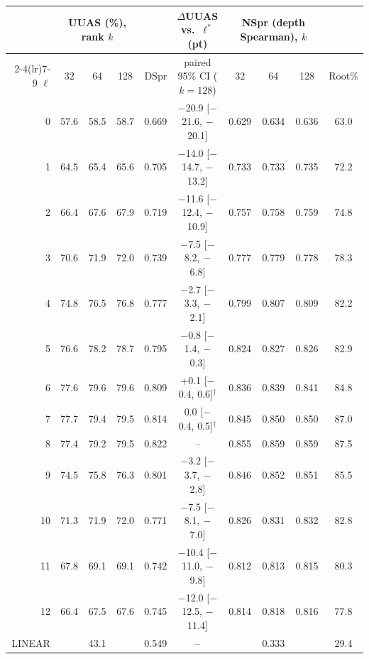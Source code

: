 \begin{tabular}{rccccccccc}
\toprule
 & \multicolumn{3}{c}{UUAS (\%), rank $k$} & & $\Delta$UUAS vs.\ $\ell^*$ (pt) & \multicolumn{3}{c}{NSpr (depth Spearman), $k$} & \\
\cmidrule(lr){2-4}\cmidrule(lr){7-9}
$\ell$ & 32 & 64 & 128 & DSpr & paired 95\% CI ($k{=}128$) & 32 & 64 & 128 & Root\% \\
\midrule
0 & 57.6 & 58.5 & 58.7 & 0.669 & $-$20.9 [$-$21.6, $-$20.1] & 0.629 & 0.634 & 0.636 & 63.0 \\
1 & 64.5 & 65.4 & 65.6 & 0.705 & $-$14.0 [$-$14.7, $-$13.2] & 0.733 & 0.733 & 0.735 & 72.2 \\
2 & 66.4 & 67.6 & 67.9 & 0.719 & $-$11.6 [$-$12.4, $-$10.9] & 0.757 & 0.758 & 0.759 & 74.8 \\
3 & 70.6 & 71.9 & 72.0 & 0.739 & $-$7.5 [$-$8.2, $-$6.8] & 0.777 & 0.779 & 0.778 & 78.3 \\
4 & 74.8 & 76.5 & 76.8 & 0.777 & $-$2.7 [$-$3.3, $-$2.1] & 0.799 & 0.807 & 0.809 & 82.2 \\
5 & 76.6 & 78.2 & 78.7 & 0.795 & $-$0.8 [$-$1.4, $-$0.3] & 0.824 & 0.827 & 0.826 & 82.9 \\
6 & 77.6 & 79.6 & 79.6 & 0.809 & +0.1 [$-$0.4, 0.6]$^\dagger$ & 0.836 & 0.839 & 0.841 & 84.8 \\
7 & 77.7 & 79.4 & 79.5 & 0.814 & 0.0 [$-$0.4, 0.5]$^\dagger$ & 0.845 & 0.850 & 0.850 & 87.0 \\
\rowcolor{black!8} 8 & 77.4 & 79.2 & 79.5 & 0.822 & -- & 0.855 & 0.859 & 0.859 & 87.5 \\
9 & 74.5 & 75.8 & 76.3 & 0.801 & $-$3.2 [$-$3.7, $-$2.8] & 0.846 & 0.852 & 0.851 & 85.5 \\
10 & 71.3 & 71.9 & 72.0 & 0.771 & $-$7.5 [$-$8.1, $-$7.0] & 0.826 & 0.831 & 0.832 & 82.8 \\
11 & 67.8 & 69.1 & 69.1 & 0.742 & $-$10.4 [$-$11.0, $-$9.8] & 0.812 & 0.813 & 0.815 & 80.3 \\
12 & 66.4 & 67.5 & 67.6 & 0.745 & $-$12.0 [$-$12.5, $-$11.4] & 0.814 & 0.818 & 0.816 & 77.8 \\
\midrule
LINEAR & \multicolumn{3}{c}{43.1} & 0.549 & -- & \multicolumn{3}{c}{0.333} & 29.4 \\
\bottomrule
\end{tabular}
